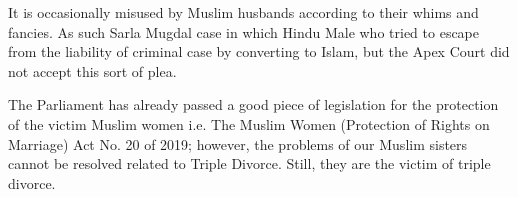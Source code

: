 \begin{multicols}{2}
\vspace{-.1cm}
\noi
It is occasionally misused by Muslim husbands according to their whims and fancies. As such
Sarla Mugdal case in which Hindu Male who tried to escape from the liability of criminal case by converting to Islam, but the Apex Court did not accept this sort of
plea.

\noi
The Parliament has already passed a good piece of legislation for the protection of the victim
Muslim women i.e. The Muslim Women (Protection of Rights on Marriage) Act No. 20 of
2019; however, the problems of our Muslim sisters cannot be resolved related to Triple
Divorce. Still, they are the victim of triple divorce. 

\vspace{.1cm}



\end{multicols}
